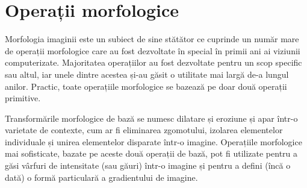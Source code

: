\documentclass[a4paper,12pt]{report}
\begin{document}
\section{Operații morfologice}
Morfologia imaginii este un subiect de sine stătător ce cuprinde un număr mare de operații morfologice care au fost dezvoltate în special în primii ani ai viziunii computerizate. Majoritatea operațiilor au fost dezvoltate pentru un scop specific sau altul, iar unele dintre acestea și-au găsit o utilitate mai largă de-a lungul anilor. Practic, toate operațiile morfologice se bazează pe doar două operații primitive.

Transformările morfologice de bază se numesc dilatare și eroziune și apar într-o varietate de contexte, cum ar fi eliminarea zgomotului, izolarea elementelor individuale și unirea elementelor disparate într-o imagine. Operațiile morfologice mai sofisticate, bazate pe aceste două operații de bază, pot fi utilizate pentru a găsi vârfuri de intensitate (sau găuri) într-o imagine și pentru a defini (încă o dată) o formă particulară a gradientului de imagine.
\end{document}
